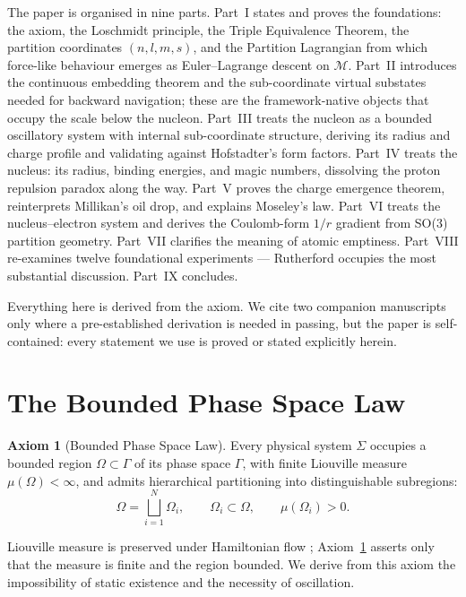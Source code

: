 \documentclass[11pt,a4paper]{article}
\theoremstyle{definition}
\newtheorem{axiom}[theorem]{Axiom}
\theoremstyle{remark}
\newcommand{\Depth}{\mathcal{M}}
\begin{document}
The paper is organised in nine parts. Part~I states and proves the foundations: the axiom, the Loschmidt principle, the Triple Equivalence Theorem, the partition coordinates $(n,l,m,s)$, and the Partition Lagrangian from which force-like behaviour emerges as Euler--Lagrange descent on $\Depth$. Part~II introduces the continuous embedding theorem and the sub-coordinate virtual substates needed for backward navigation; these are the framework-native objects that occupy the scale below the nucleon. Part~III treats the nucleon as a bounded oscillatory system with internal sub-coordinate structure, deriving its radius and charge profile and validating against Hofstadter's form factors. Part~IV treats the nucleus: its radius, binding energies, and magic numbers, dissolving the proton repulsion paradox along the way. Part~V proves the charge emergence theorem, reinterprets Millikan's oil drop, and explains Moseley's law. Part~VI treats the nucleus--electron system and derives the Coulomb-form $1/r$ gradient from SO(3) partition geometry. Part~VII clarifies the meaning of atomic emptiness. Part~VIII re-examines twelve foundational experiments --- Rutherford occupies the most substantial discussion. Part~IX concludes.

Everything here is derived from the axiom. We cite two companion manuscripts \citep{sachikonye2025a, sachikonye2025b} only where a pre-established derivation is needed in passing, but the paper is self-contained: every statement we use is proved or stated explicitly herein.

\section{The Bounded Phase Space Law}
\label{sec:axiom}

\begin{axiom}[Bounded Phase Space Law]
\label{ax:bps}
Every physical system $\Sigma$ occupies a bounded region $\Omega \subset \Gamma$ of its phase space $\Gamma$, with finite Liouville measure $\mu(\Omega) < \infty$, and admits hierarchical partitioning into distinguishable subregions:
\[
\Omega = \bigsqcup_{i=1}^{N} \Omega_i, \qquad \Omega_i \subset \Omega, \qquad \mu(\Omega_i) > 0.
\]
\end{axiom}

Liouville measure is preserved under Hamiltonian flow \citep{liouville1838}; Axiom~\ref{ax:bps} asserts only that the measure is finite and the region bounded. We derive from this axiom the impossibility of static existence and the necessity of oscillation.
\end{document}
